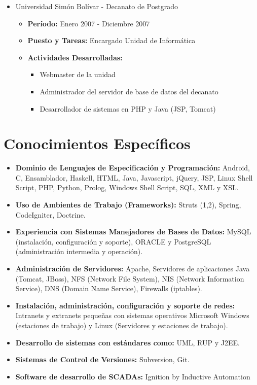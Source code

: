 \documentclass[letterpaper,12pt]{report}
\begin{document}
\begin{itemize}
        \item{Universidad Simón Bolívar - Decanato de Postgrado}
        \begin{itemize}
            \item{\textbf{Período:} Enero 2007 - Diciembre 2007}
            \item{\textbf{Puesto y Tareas:} Encargado Unidad de Informática}
            \item{\textbf{Actividades Desarrolladas:}}
            \begin{itemize}
                \item Webmaster de la unidad
                \item Administrador del servidor de base de datos del decanato
                \item Desarrollador de sistemas en PHP y Java (JSP, Tomcat)
            \end{itemize}
        \end{itemize}

    \end{itemize}


\section{Conocimientos Específicos}

    \begin{itemize}
    \item
    \textbf{Dominio de Lenguajes de Especificación y Programación:} Android, C, Ensamblador, Haskell, HTML, Java, Javascript, jQuery, JSP, Linux Shell Script, PHP, Python, Prolog, Windows Shell Script, SQL, XML y XSL.
    \item
    \textbf{Uso de Ambientes de Trabajo (Frameworks):} Struts (1,2), Spring, CodeIgniter, Doctrine.
    \item
    \textbf{Experiencia con Sistemas Manejadores de Bases de Datos:} MySQL (instalación, configuración y soporte), ORACLE y PostgreSQL (administración intermedia y operación).
    \item
    \textbf{Administración de Servidores:} Apache, Servidores de aplicaciones Java (Tomcat, JBoss), NFS (Network File System), NIS (Network Information Service), DNS (Domain Name Service), Firewalls (iptables).
    \item
    \textbf{Instalación, administración, configuración y soporte de redes:} Intranets y extranets peque\~{n}as con sistemas operativos Microsoft Windows (estaciones de trabajo) y Linux (Servidores y estaciones de trabajo).
    \item
    \textbf{Desarrollo de sistemas con estándares como:} UML, RUP y J2EE.
    \item
    \textbf{Sistemas de Control de Versiones:} Subversion, Git.
    \item
    \textbf{Software de desarrollo de SCADAs:} Ignition by Inductive Automation
    \end{itemize}
\end{document}
